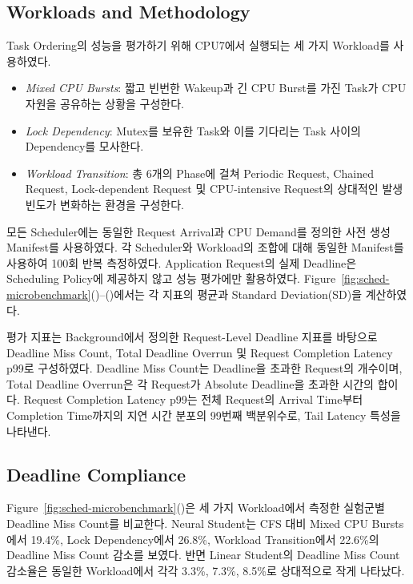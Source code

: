 \subsection{Workloads and Methodology}
\label{sec:eval-workloads-and-methodology}
Task Ordering의 성능을 평가하기 위해 CPU7에서 실행되는 세 가지 Workload를 사용하였다. 
\begin{itemize}
    \item \textit{Mixed CPU Bursts}: 짧고 빈번한 Wakeup과 긴 CPU Burst를 가진 Task가 CPU 자원을 공유하는 상황을 구성한다.

    \item \textit{Lock Dependency}: Mutex를 보유한 Task와 이를 기다리는 Task 사이의 Dependency를 모사한다.

    \item \textit{Workload Transition}: 총 6개의 Phase에 걸쳐
    Periodic Request, Chained Request, Lock-dependent Request 및 CPU-intensive Request의 상대적인 발생 빈도가 변화하는 환경을 구성한다.
\end{itemize}

모든 Scheduler에는 동일한 Request Arrival과 CPU Demand를 정의한 사전 생성 Manifest를 사용하였다.
각 Scheduler와 Workload의 조합에 대해 동일한 Manifest를 사용하여 100회
반복 측정하였다. Application Request의 실제 Deadline은 Scheduling Policy에
제공하지 않고 성능 평가에만 활용하였다.
Figure~\ref{fig:sched-microbenchmark}()--()에서는
각 지표의 평균과 Standard Deviation(SD)을 계산하였다.

평가 지표는 Background에서 정의한 Request-Level Deadline 지표를 바탕으로 Deadline Miss Count, Total Deadline Overrun 및 Request Completion Latency p99로 구성하였다. 
Deadline Miss Count는 Deadline을 초과한 Request의 개수이며, Total Deadline Overrun은 각 Request가 Absolute Deadline을 초과한 시간의 합이다. 
Request Completion Latency p99는 전체 Request의
Arrival Time부터 Completion Time까지의 지연 시간 분포의 99번째
백분위수로, Tail Latency 특성을 나타낸다.

\subsection{Deadline Compliance}
\label{sec:eval-deadline-compliance}
Figure~\ref{fig:sched-microbenchmark}()은 세 가지 Workload에서 측정한 실험군별
Deadline Miss Count를 비교한다. Neural Student는 CFS 대비 Mixed CPU Bursts에서 19.4\%, Lock Dependency에서 26.8\%, Workload Transition에서 22.6\%의 Deadline Miss Count 감소를 보였다. 
반면 Linear Student의 Deadline Miss Count 감소율은 동일한 Workload에서 각각 3.3\%, 7.3\%, 8.5\%로 상대적으로 작게 나타났다.

